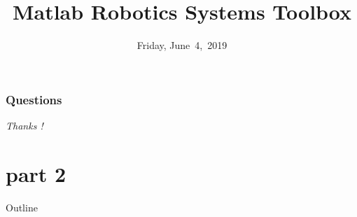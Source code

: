 \documentclass{beamer}
\begin{document}



\section*{Questions}
\begin{frame}{}
  \centering \Huge
  \emph{Thanks !}
\end{frame}
\part {part 2}
\title{Matlab Robotics Systems Toolbox}
\date[June~4,~2019]{Friday, June~4,~2019}
\begin{frame}
\maketitle
\end{frame}
\begin{frame}{Outline}
  \tableofcontents
\end{frame}
\end{document}
